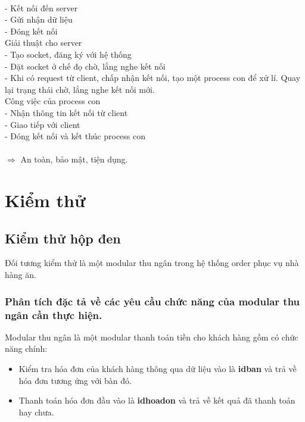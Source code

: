 \documentclass[a4paper,12pt]{report}
\begin{document}
\begin{itemize}
	\\ \hspace*{3mm} - Kết nối đến server
	\\ \hspace*{3mm} - Gửi nhận dữ liệu
	\\ \hspace*{3mm} - Đóng kết nối
	\\ Giải thuật cho server
	\\ \hspace*{3mm} - Tạo socket, đăng ký với hệ thống
	\\ \hspace*{3mm} - Đặt socket ở chế đọ chờ, lắng nghe kết nối
	\\ \hspace*{3mm} - Khi có request từ client, chấp nhận kết nối, tạo một process con để xử lí. Quay lại trạng thái chờ, lắng nghe kết nối mới.
	\\ Công việc của process con
	\\ \hspace*{3mm} - Nhận thông tin kết nối từ client
	\\ \hspace*{3mm} - Giao tiếp với client
	\\ \hspace*{3mm} - Đóng kết nối và kết thúc process con
	\\
	\\ $\Rightarrow$ An toàn, bảo mật, tiện dụng.
	
\end{itemize}
\chapter{Kiểm thử}
\section{Kiểm thử hộp đen}
Đối tương kiểm thử là một modular thu ngân trong hệ thống order phục vụ nhà hàng ăn.
\subsection{Phân tích đặc tả về các yêu cầu chức năng của modular thu ngân cần thực hiện.}
Modular thu ngân là một modular thanh toán tiền cho khách hàng gồm có chức năng chính:
\begin{itemize}
\item Kiểm tra hóa đơn của khách hàng thông qua dữ liệu vào là \textbf{idban} và trả về hóa đơn tương ứng với bàn đó.
\item Thanh toán hóa đơn đầu vào là \textbf{idhoadon} và trả về kết quả đã thanh toán hay chưa.
\end{itemize}
\end{document}
